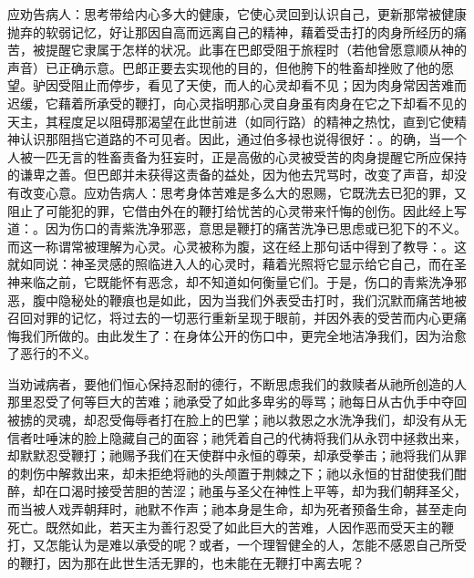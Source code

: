 应劝告病人：思考带给内心多大的健康，它使心灵回到认识自己，更新那常被健康抛弃的软弱记忆，好让那因自高而远离自己的精神，藉着受击打的肉身所经历的痛苦，被提醒它隶属于怎样的状况。此事在巴郎受阻于旅程时（若他曾愿意顺从神的声音）已正确示意。巴郎正要去实现他的目的，但他胯下的牲畜却挫败了他的愿望。驴因受阻止而停步，看见了天使，而人的心灵却看不见；因为肉身常因苦难而迟缓，它藉着所承受的鞭打，向心灵指明那心灵自身虽有肉身在它之下却看不见的天主，其程度足以阻碍那渴望在此世前进（如同行路）的精神之热忱，直到它使精神认识那阻挡它道路的不可见者。因此，通过伯多禄也说得很好：。的确，当一个人被一匹无言的牲畜责备为狂妄时，正是高傲的心灵被受苦的肉身提醒它所应保持的谦卑之善。但巴郎并未获得这责备的益处，因为他去咒骂时，改变了声音，却没有改变心意。应劝告病人：思考身体苦难是多么大的恩赐，它既洗去已犯的罪，又阻止了可能犯的罪，它借由外在的鞭打给忧苦的心灵带来忏悔的创伤。因此经上写道：。因为伤口的青紫洗净邪恶，意思是鞭打的痛苦洗净已思虑或已犯下的不义。而这一称谓常被理解为心灵。心灵被称为腹，这在经上那句话中得到了教导：。这就如同说：神圣灵感的照临进入人的心灵时，藉着光照将它显示给它自己，而在圣神来临之前，它既能怀有恶念，却不知道如何衡量它们。于是，伤口的青紫洗净邪恶，腹中隐秘处的鞭痕也是如此，因为当我们外表受击打时，我们沉默而痛苦地被召回对罪的记忆，将过去的一切恶行重新呈现于眼前，并因外表的受苦而内心更痛悔我们所做的。由此发生了：在身体公开的伤口中，更完全地洁净我们，因为治愈了恶行的不义。\par

当劝诫病者，要他们恒心保持忍耐的德行，不断思虑我们的救赎者从祂所创造的人那里忍受了何等巨大的苦难；祂承受了如此多卑劣的辱骂；祂每日从古仇手中夺回被掳的灵魂，却忍受侮辱者打在脸上的巴掌；祂以救恩之水洗净我们，却没有从无信者吐唾沫的脸上隐藏自己的面容；祂凭着自己的代祷将我们从永罚中拯救出来，却默默忍受鞭打；祂赐予我们在天使群中永恒的尊荣，却承受拳击；祂将我们从罪的刺伤中解救出来，却未拒绝将祂的头颅置于荆棘之下；祂以永恒的甘甜使我们酣醉，却在口渴时接受苦胆的苦涩；祂虽与圣父在神性上平等，却为我们朝拜圣父，而当被人戏弄朝拜时，祂默不作声；祂本身是生命，却为死者预备生命，甚至走向死亡。既然如此，若天主为善行忍受了如此巨大的苦难，人因作恶而受天主的鞭打，又怎能认为是难以承受的呢？或者，一个理智健全的人，怎能不感恩自己所受的鞭打，因为那在此世生活无罪的，也未能在无鞭打中离去呢？\par

